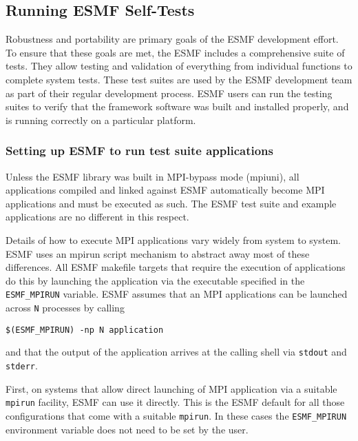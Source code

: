 
\subsection{Running ESMF Self-Tests}
\label{testing}

Robustness and portability are primary goals of the ESMF development
effort.  To ensure that these goals are met, the ESMF includes a
comprehensive suite of tests.  They allow testing and validation of
everything from individual functions to complete system tests.  These
test suites are used by the ESMF development team as part of their
regular development process.  ESMF users can run the testing suites to
verify that the framework software was built and installed properly,
and is running correctly on a particular platform.

\subsubsection{Setting up ESMF to run test suite applications}
\label{ESMFRunSetting}

Unless the ESMF library was built in MPI-bypass mode (mpiuni), all applications
compiled and linked against ESMF automatically become MPI applications and must
be executed as such. The ESMF test suite and example applications are no
different in this respect.

Details of how to execute MPI applications vary widely from system to system.
ESMF uses an mpirun script mechanism to abstract away most of these differences.
All ESMF makefile targets that require the execution of applications do this by
launching the application via the executable specified in the 
{\tt ESMF\_MPIRUN} variable. ESMF assumes that an MPI applications can be 
launched across {\tt N} processes by calling

\begin{verbatim}
$(ESMF_MPIRUN) -np N application
\end{verbatim}

and that the output of the application arrives at the calling shell via 
{\tt stdout} and {\tt stderr}.

First, on systems that allow direct launching of MPI application via a suitable
{\tt mpirun} facility, ESMF can use it directly. This is the ESMF default for
all those configurations that come with a suitable {\tt mpirun}. In these
cases the {\tt ESMF\_MPIRUN} environment variable does not need to be set by
the user.

